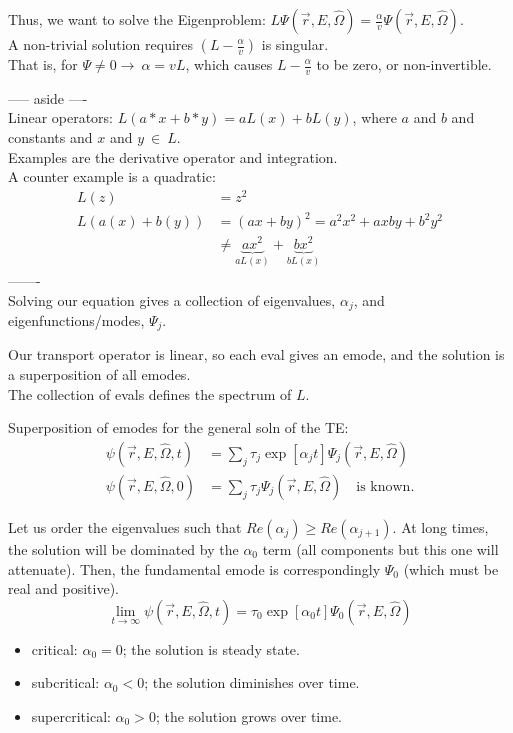 \documentclass[12pt]{article}
\newcommand{\rvec}{\ensuremath{\vec{r}}}
\newcommand{\vOmega}{\ensuremath{\hat{\Omega}}}
\begin{document}
Thus, we want to solve the Eigenproblem: $L\Psi(\rvec, E, \vOmega) = \frac{\alpha}{v}\Psi(\rvec, E, \vOmega)$.\\
A non-trivial solution requires $(L - \frac{\alpha}{v})$ is singular. \\
That is, for $\Psi \neq 0 \rightarrow \: \alpha = v L$, which causes $L - \frac{\alpha}{v}$ to be zero, or non-invertible.


----- aside ----\\
Linear operators: $L(a*x + b*y) = aL(x) + bL(y)$, where $a$ and $b$ and constants and $x$ and $y \: \in \: L$.\\
Examples are the derivative operator and integration. \\
A counter example is a quadratic:
\begin{align*}
L(z) &= z^2 \\
L(a(x) + b(y)) &= (ax + by)^2 = a^2 x^2 + axby + b^2 y^2 \\
& \neq \underbrace{a x^2}_{aL(x)} + \underbrace{b x^2}_{bL(x)}
\end{align*}
-------\\
Solving our equation gives a collection of eigenvalues, $\alpha_j$, and eigenfunctions/modes, $\Psi_j$. 

Our transport operator is linear, so each eval gives an emode, and the solution is a superposition of all emodes. \\
The collection of evals defines the spectrum of $L$.

Superposition of emodes for the general soln of the TE:
\begin{align*}
\psi(\rvec, E, \vOmega, t) &= \sum_{j} \tau_j \exp[\alpha_j t] \Psi_j(\rvec, E, \vOmega) \\
\psi(\rvec, E, \vOmega, 0) &= \sum_{j} \tau_j \Psi_j(\rvec, E, \vOmega) \quad \text{is known.}
\end{align*}

Let us order the eigenvalues such that $Re(\alpha_j) \geq Re(\alpha_{j+1})$. At long times, the solution will be dominated by the $\alpha_0$ term (all components but this one will attenuate). Then, the fundamental emode is correspondingly $\Psi_0$ (which must be real and positive).
\[\lim_{t \to \infty} \psi(\rvec, E, \vOmega, t) = \tau_0 \exp[\alpha_0 t] \Psi_0(\rvec, E, \vOmega)\]
%
\begin{itemize}
\item critical: $\alpha_0 = 0$; the solution is steady state. 
\item subcritical: $\alpha_0 < 0$; the solution diminishes over time.
\item supercritical: $\alpha_0 > 0$; the solution grows over time.
\end{itemize} 
%
\end{document}
